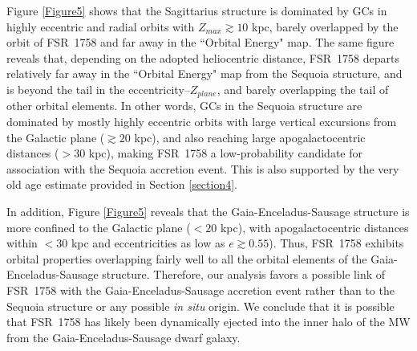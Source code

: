 \documentclass[longauth]{aa} %
\begin{document}
 Figure \ref{Figure5} shows that the Sagittarius structure is dominated by GCs in highly eccentric and radial orbits with $Z_{max}\gtrsim10 $ kpc, barely overlapped by the orbit of FSR~1758 and far away in the ``Orbital Energy" map. The same figure reveals that, depending on the adopted heliocentric distance, FSR~1758 departs relatively far away in the ``Orbital Energy" map from the Sequoia structure, and is beyond the tail in the eccentricity--$Z_{plane}$, and barely overlapping the tail of other orbital elements. In other words, GCs in the Sequoia structure are dominated by mostly highly eccentric orbits with large vertical excursions from the Galactic plane ($\gtrsim 20$ kpc), and also reaching large apogalactocentric distances ($>30$ kpc), making FSR~1758 a low-probability candidate for association with the Sequoia accretion event. This is also supported by the very old age estimate provided in Section \ref{section4}. 
 
 In addition, Figure \ref{Figure5} reveals that the Gaia-Enceladus-Sausage structure is more confined to the Galactic plane ($< 20$ kpc), with apogalactocentric distances within $<30$ kpc and eccentricities as low as $e \gtrsim 0.55$). Thus, FSR~1758 exhibits orbital properties overlapping fairly well to all the orbital elements of the Gaia-Enceladus-Sausage structure. Therefore, our analysis favors a possible link of FSR~1758 with the Gaia-Enceladus-Sausage accretion event rather than to the Sequoia structure or any possible \textit{in situ} origin. We conclude that it is possible that FSR~1758 has likely been dynamically ejected into the inner halo of the MW from the Gaia-Enceladus-Sausage dwarf galaxy.
\end{document}
